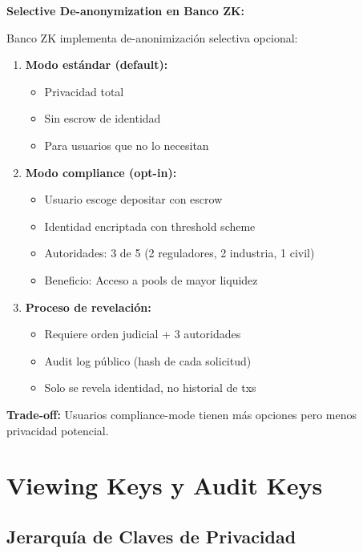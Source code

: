 \documentclass[11pt,a4paper,twoside]{book}
\theoremstyle{definition}
\theoremstyle{remark}
\begin{document}
\begin{bancozk}
\textbf{Selective De-anonymization en Banco ZK:}

Banco ZK implementa de-anonimización selectiva opcional:

\begin{enumerate}
    \item \textbf{Modo estándar (default):}
    \begin{itemize}
        \item Privacidad total
        \item Sin escrow de identidad
        \item Para usuarios que no lo necesitan
    \end{itemize}
    
    \item \textbf{Modo compliance (opt-in):}
    \begin{itemize}
        \item Usuario escoge depositar con escrow
        \item Identidad encriptada con threshold scheme
        \item Autoridades: 3 de 5 (2 reguladores, 2 industria, 1 civil)
        \item Beneficio: Acceso a pools de mayor liquidez
    \end{itemize}
    
    \item \textbf{Proceso de revelación:}
    \begin{itemize}
        \item Requiere orden judicial + 3 autoridades
        \item Audit log público (hash de cada solicitud)
        \item Solo se revela identidad, no historial de txs
    \end{itemize}
\end{enumerate}

\textbf{Trade-off:} Usuarios compliance-mode tienen más opciones pero menos privacidad potencial.
\end{bancozk}
\section{Viewing Keys y Audit Keys}
\label{sec:viewing-keys}

\subsection{Jerarquía de Claves de Privacidad}
\end{document}
